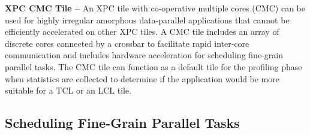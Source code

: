 
\textbf{XPC CMC Tile --} An XPC tile with co-operative multiple cores
(CMC) can be used for highly irregular amorphous data-parallel
applications that cannot be efficiently accelerated on other XPC tiles. A
CMC tile includes an array of discrete cores connected by a crossbar to
facilitate rapid inter-core communication and includes hardware
acceleration for scheduling fine-grain parallel tasks. The CMC tile can
function as a default tile for the profiling phase when statistics are
collected to determine if the application would be more suitable for a
TCL or an LCL tile.



\subsection{Scheduling Fine-Grain Parallel Tasks}

%    
%    


